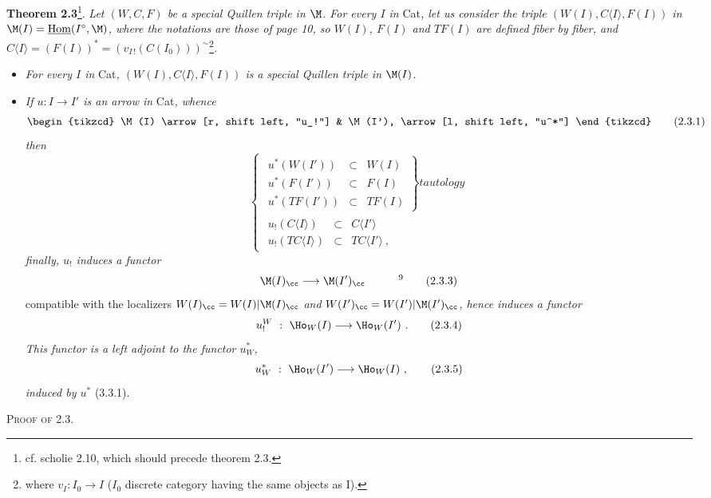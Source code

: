 \textbf{Theorem 2.3}\footnote[7]{cf. scholie 2.10, which should precede theorem 2.3.}. \textit{Let $(W,C,F)$ be a special Quillen triple in $\M$. For every $I$ in} Cat\textit{, let us consider the triple $(W(I),C\langle I\rangle,F(I))$ in $\M(I) = \underline{\mathrm{Hom}}(I^{\circ},\M)$, where the notations are those of page 10, so $W(I)$, $F(I)$ and $TF(I)$ are defined fiber by fiber, and $C\langle I\rangle = (F(I))^* = (v_{I\,!}(C(I_0)))^{\sim}$}\footnote[8]{where $v_I : I_0 \longrightarrow I$ ($I_0$ discrete category having the same objects as I).}\textit{.}
\begin{itemize}
\item[1°)] \textit{For every $I$ in} Cat\textit{, $(W(I),C\langle I\rangle,F(I))$ is}
\textit{a special Quillen triple in $\M(I)$.}
\item[2°)] \textit{If $u : I \longrightarrow I'$ is an arrow in} Cat\textit{, whence}
\[
\begin{tikzcd}
\M(I) \arrow[r, shift left, "u_!"] & \M(I'), \arrow[l, shift left, "u^*"]
\end{tikzcd}
\tag*{(2.3.1)}
\]
\textit{then}
\[
\left\{
\begin{array}{l}
\left.\begin{array}{rcl}
u^*(W(I')) & \subset & W(I)\\
u^*(F(I')) & \subset & F(I)\\
u^*(TF(I')) & \subset & TF(I)
\end{array}\right\}\textit{tautology}\\
\begin{array}{rcl}
u_!(C\langle I\rangle) & \subset & C\langle I'\rangle\\
u_!(TC\langle I\rangle) & \subset & TC\langle I'\rangle\ ,
\end{array}
\end{array}\right.
\tag*{(2.3.2)}
\]
\textit{finally, $u_!$ induces a functor}
\[
\M(I)_{\cc} \longrightarrow \M(I')_{\cc} \qquad\quad \text{\footnotemark[9]}
\tag*{(2.3.3)}
\]
compatible with the localizers $W(I)_{\cc} = W(I)|\M(I)_{\cc}$ \textit{and} $W(I')_{\cc} = W(I')|\M(I')_{\cc}$\textit{, hence induces a functor}
\[
u_!^W\ :\ \Ho_W(I) \longrightarrow \Ho_W(I')\ .
\tag*{(2.3.4)}
\]
\textit{This functor is a left adjoint to the functor $u^*_W$,}
\[
u^*_W\ :\ \Ho_W(I') \longrightarrow \Ho_W(I)\ ,
\tag*{(2.3.5)}
\]
\textit{induced by $u^*$} (3.3.1). %
\end{itemize}
\textsc{Proof of 2.3.}

